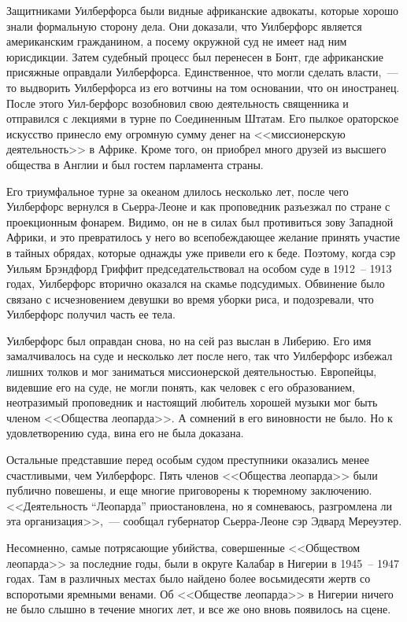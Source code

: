\documentclass[12pt,a4paper,twoside,openany,svgnames]{memoir}
\begin{document}
Защитниками Уилберфорса были видные африканские адвокаты, которые хорошо знали формальную сторону дела. Они доказали, что Уилберфорс является американским гражданином, а посему окружной суд не имеет над ним юрисдикции. Затем судебный процесс был перенесен в Бонт, где африканские присяжные оправдали Уилберфорса. Единственное, что могли сделать власти,~--- то выдворить Уилберфорса из его вотчины на том основании, что он иностранец. После этого Уил-берфорс возобновил свою деятельность священника и отправился с лекциями в турне по Соединенным Штатам. Его пылкое ораторское искусство принесло ему огромную сумму денег на <<миссионерскую деятельность>> в Африке. Кроме того, он приобрел много друзей из высшего общества в Англии и был гостем парламента страны.

Его триумфальное турне за океаном длилось несколько лет, после чего Уилберфорс вернулся в Сьерра-Леоне и как проповедник разъезжал по стране с проекционным фонарем. Видимо, он не в силах был противиться зову Западной Африки, и это превратилось у него во всепобеждающее желание принять участие в тайных обрядах, которые однажды уже привели его к беде. Поэтому, когда сэр Уильям Брэндфорд Гриффит председательствовал на особом суде в 1912~-- 1913 годах, Уилберфорс вторично оказался на скамье подсудимых. Обвинение было связано с исчезновением девушки во время уборки риса, и подозревали, что Уилберфорс получил часть ее тела.

Уилберфорс был оправдан снова, но на сей раз выслан в Либерию. Его имя замалчивалось на суде и несколько лет после него, так что Уилберфорс избежал лишних толков и мог заниматься миссионерской деятельностью. Европейцы, видевшие его на суде, не могли понять, как человек с его образованием, неотразимый проповедник и настоящий любитель хорошей музыки мог быть членом <<Общества леопарда>>. А сомнений в его виновности не было. Но к удовлетворению суда, вина его не была доказана.

Остальные представшие перед особым судом преступники оказались менее счастливыми, чем Уилберфорс. Пять членов <<Общества леопарда>> были публично повешены, и еще многие приговорены к тюремному заключению. <<Деятельность ``Леопарда'' приостановлена, но я сомневаюсь, разгромлена ли эта организация>>,~--- сообщал губернатор Сьерра-Леоне сэр Эдвард Мереуэтер.

Несомненно, самые потрясающие убийства, совершенные <<Обществом леопарда>> за последние годы, были в округе Калабар в Нигерии в 1945~-- 1947 годах. Там в различных местах было найдено более восьмидесяти жертв со вспоротыми яремными венами. Об <<Обществе леопарда>> в Нигерии ничего не было слышно в течение многих лет, и все же оно вновь появилось на сцене.
\end{document}
